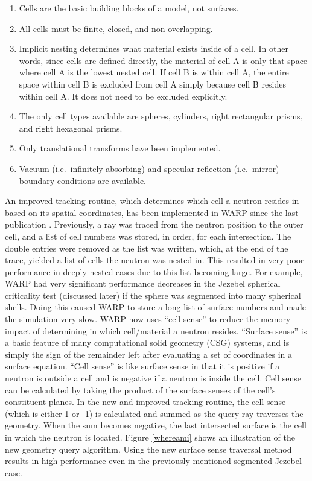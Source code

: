 \documentclass[preprint,12pt]{elsarticle}
\begin{document}
\begin{enumerate}
\item Cells are the basic building blocks of a model, not surfaces.
\item All cells must be finite, closed, and non-overlapping.
\item Implicit nesting determines what material exists inside of a cell.  In other words, since cells are defined directly, the material of cell A is only that space where cell A is the lowest nested cell.  If cell B is within cell A, the entire space within cell B is excluded from cell A simply because cell B resides within cell A.  It does not need to be excluded explicitly.
\item The only cell types available are spheres, cylinders, right rectangular prisms, and right hexagonal prisms.
\item Only translational transforms have been implemented.
\item Vacuum (i.e.\ infinitely absorbing) and specular reflection  (i.e.\ mirror) boundary conditions are available.
\end{enumerate}

An improved tracking routine, which determines which cell a neutron resides in based on its spatial coordinates, has been implemented in WARP since the last publication \cite{algorithms}.  Previously, a ray was traced from the neutron position to the outer cell, and a list of cell numbers was stored, in order, for each intersection.  The double entries were removed as the list was written, which, at the end of the trace, yielded a list of cells the neutron was nested in.  This resulted in very poor performance in deeply-nested cases due to this list becoming large.  For example, WARP had very significant performance decreases in the Jezebel spherical criticality test (discussed later) if the sphere was segmented into many spherical shells.  Doing this caused WARP to store a long list of surface numbers and made the simulation very slow.  
WARP now uses ``cell sense'' to reduce the memory impact of determining in which cell/material a neutron resides.  ``Surface sense'' is a basic feature of many computational solid geometry (CSG) systems, and is simply the sign of the remainder left after evaluating a set of coordinates in a surface equation. ``Cell sense'' is like surface sense in that it is positive if a neutron is outside a cell and is negative if a neutron is inside the cell.  Cell sense can be calculated by taking the product of the surface senses of the cell's constituent planes.  In the new and improved tracking routine, the cell sense (which is either 1 or -1) is calculated and summed as the query ray traverses the geometry.  When the sum becomes negative, the last intersected surface is the cell in which the neutron is located.   Figure \ref{whereami} shows an illustration of the new geometry query algorithm.  Using the new surface sense traversal method results in high performance even in the previously mentioned segmented Jezebel case.
\end{document}

